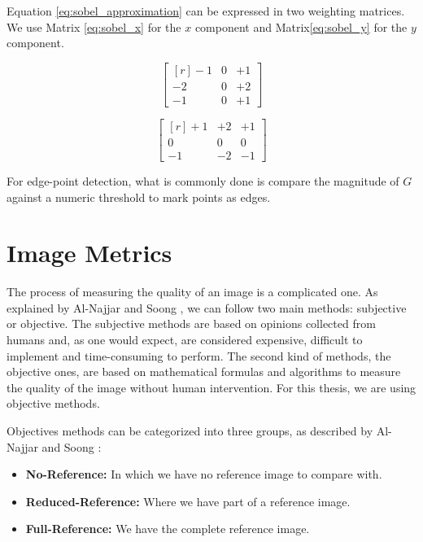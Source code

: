 \documentclass{cslthse-msc}
\begin{document}
Equation \ref{eq:sobel_approximation} can be expressed in two weighting matrices. We use Matrix \ref{eq:sobel_x} for the $x$ component and Matrix\ref{eq:sobel_y} for the $y$ component.

\begin{equation}
\begin{bmatrix*}[r]\label{eq:sobel_x}
-1 &  0 & +1 \\
-2 &  0 & +2 \\
-1 &  0 & +1
\end{bmatrix*}
\end{equation}

\begin{equation}
\begin{bmatrix*}[r]\label{eq:sobel_y}
+1 & +2 & +1 \\
 0 &  0 &  0 \\
-1 & -2 & -1
\end{bmatrix*}
\end{equation}

For edge-point detection, what is commonly done is compare the magnitude of $G$ against a numeric threshold to mark points as edges. 

\section{Image Metrics}
The process of measuring the quality of an image is a complicated one. As explained by Al-Najjar and Soong \cite{Yusra2012}, we can follow two main methods: subjective or objective. The subjective methods are based on opinions collected from humans and, as one would expect, are considered expensive, difficult to implement and time-consuming to perform. The second kind of methods, the objective ones, are based on mathematical formulas and algorithms to measure the quality of the image without human intervention. For this thesis, we are using objective methods. 

Objectives methods can be categorized into three groups, as described by Al-Najjar and Soong \cite{Yusra2012}:

\begin{itemize}
	\item \textbf{No-Reference:} In which we have no reference image to compare with.
	\item \textbf{Reduced-Reference:} Where we have part of a reference image.
	\item \textbf{Full-Reference:} We have the complete reference image.
\end{itemize}
\end{document}
